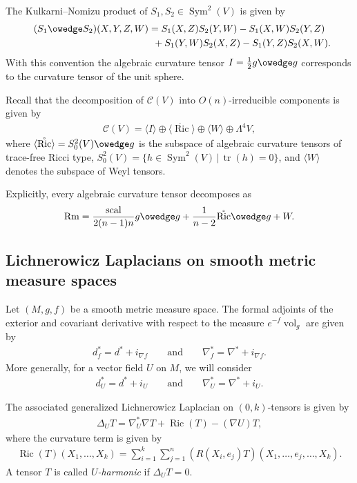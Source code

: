 \documentclass[pdftex]{sigma}
\numberwithin{equation}{section}
\newcommand{\vol}{\operatorname{vol}}
\newcommand{\Ric} {\operatorname{Ric}}
\newcommand{ \tr } {\operatorname{tr}}
\newcommand{\Rm} {\operatorname{Rm}}
\newcommand{\scal} {\operatorname{scal}}
\begin{document}
The Kulkarni--Nomizu product of $S_1, S_2 \in \operatorname{Sym}^2(V)$ is given by
\begin{gather*}
(S_1 \owedge S_2)(X,Y,Z,W) =   S_1(X,Z)S_2(Y,W)-S_1(X,W)S_2(Y,Z) \\
\hphantom{(S_1 \owedge S_2)(X,Y,Z,W) =}{}  +S_1(Y,W)S_2(X,Z)-S_1(Y,Z)S_2(X,W).
\end{gather*}
With this convention the algebraic curvature tensor $I= \frac{1}{2} g \owedge g$ corresponds to the curvature tensor of the unit sphere.

Recall that the decomposition of $\mathcal{C}(V)$ into $O(n)$-irreducible components is given by
\begin{gather*}
\mathcal{C}(V) = \langle I \rangle \oplus \langle \mathring{\Ric} \rangle \oplus \langle W \rangle \oplus \Lambda^4 V,
\end{gather*}
where $\langle \mathring{\Ric} \rangle = S_0^2(V) \owedge g$ is the subspace of algebraic curvature tensors of trace-free Ricci type, $S_0^2(V)= \big\lbrace h \in \operatorname{Sym}^2(V) \, \vert \, \tr(h)= 0 \big\rbrace$, and $\langle W \rangle$ denotes the subspace of Weyl tensors.

Explicitly, every algebraic curvature tensor decomposes as
\begin{gather*}
\Rm = \frac{\scal}{2(n-1)n} g \owedge g + \frac{1}{n-2} \mathring{\Ric} \owedge g + W.
\end{gather*}

\subsection{Lichnerowicz Laplacians on smooth metric measure spaces}
Let $(M,g,f)$ be a smooth metric measure space. The formal adjoints of the exterior and covariant derivative with respect to the measure $e^{-f} \vol_g$ are given by
\begin{gather*}
d^{*}_f = d^{*} + i_{\nabla f} \qquad \text{and} \qquad \nabla^{*}_f = \nabla^{*} + i_{\nabla f}.
\end{gather*}
More generally, for a vector field $U$ on $M$, we will consider
\begin{gather*}
d^{*}_U = d^{*} + i_{U} \qquad \text{and} \qquad \nabla^{*}_U = \nabla^{*} + i_{U}.
\end{gather*}

The associated generalized Lichnerowicz Laplacian on $(0,k)$-tensors is given by
\begin{gather*}
\Delta_U T = \nabla^{*}_U \nabla T + \Ric(T) - (\nabla U) T,
\end{gather*}
where the curvature term is given by
\begin{gather*}
\Ric(T)(X_1, \dots, X_k) = \sum_{i=1}^k \sum_{j=1}^n (R(X_i,e_j)T) (X_1, \dots, e_j, \dots, X_k).
\end{gather*}
A tensor $T$ is called {\em $U$-harmonic} if $\Delta_U T =0$.
\end{document}
